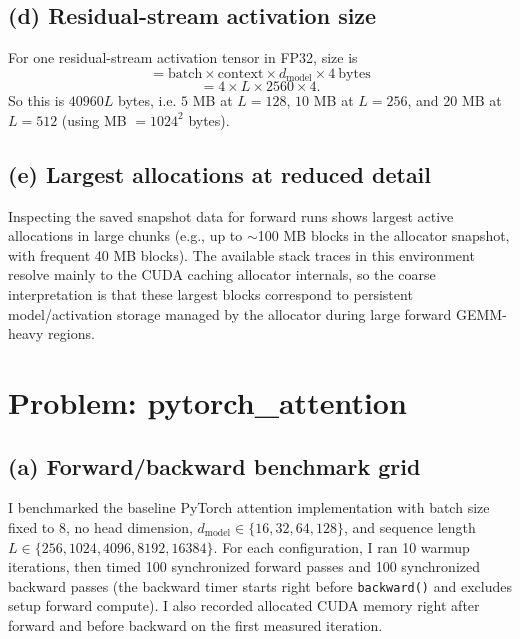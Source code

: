 \documentclass[11pt]{article}
\begin{document}
\subsection*{(d) Residual-stream activation size}
For one residual-stream activation tensor in FP32, size is
\[
= \mathrm{batch} \times \mathrm{context} \times d_{\mathrm{model}} \times 4\ \mathrm{bytes}
\]
\[
= 4 \times L \times 2560 \times 4.
\]
So this is \(40960L\) bytes, i.e. \(5\) MB at \(L{=}128\), \(10\) MB at \(L{=}256\), and \(20\) MB at \(L{=}512\) (using MB \(=1024^2\) bytes).

\subsection*{(e) Largest allocations at reduced detail}
Inspecting the saved snapshot data for forward runs shows largest active allocations in large chunks (e.g., up to \(\sim\)100 MB blocks in the allocator snapshot, with frequent 40 MB blocks). The available stack traces in this environment resolve mainly to the CUDA caching allocator internals, so the coarse interpretation is that these largest blocks correspond to persistent model/activation storage managed by the allocator during large forward GEMM-heavy regions.

\section{Problem: pytorch\_attention}
\subsection*{(a) Forward/backward benchmark grid}
I benchmarked the baseline PyTorch attention implementation with batch size fixed to 8, no head dimension, \(d_{\text{model}} \in \{16, 32, 64, 128\}\), and sequence length \(L \in \{256, 1024, 4096, 8192, 16384\}\). For each configuration, I ran 10 warmup iterations, then timed 100 synchronized forward passes and 100 synchronized backward passes (the backward timer starts right before \texttt{backward()} and excludes setup forward compute). I also recorded allocated CUDA memory right after forward and before backward on the first measured iteration.
\end{document}
